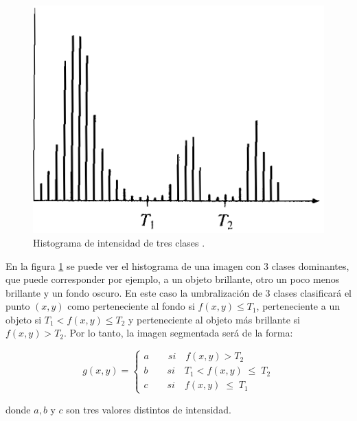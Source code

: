 \begin{figure}[ht!]
\begin{center}
\includegraphics[scale=0.35]{img/hist3clases.png}
\end{center}
\vspace{-0.5cm}
\caption{Histograma de intensidad de tres clases \cite{segment}.}
\label{hist3class}
\end{figure}

En la figura \ref{hist3class} se puede ver el histograma de una imagen con 3 clases dominantes, que puede corresponder por ejemplo, a un objeto brillante, otro un poco menos brillante y un fondo oscuro. En este caso la umbralización de 3 clases clasificará el punto $(x,y)$ como perteneciente al fondo si $f(x,y) {\leq} T_1$, perteneciente a un objeto si $T_1 < f(x,y) {\leq} T_2$ y perteneciente al objeto más brillante si $f(x,y) > T_2$. Por lo tanto, la imagen segmentada será de la forma:

\begin{equation}
g(x,y) = \left\{
\begin{array}{l}
\displaystyle a{\qquad}si{\quad}f(x,y) > {T_2}\\
\displaystyle b{\qquad}si{\quad}{T_1} < f(x,y)\;{\leq}\;{T_2}\\
\displaystyle c{\qquad}si{\quad}f(x,y)\;{\leq}\;{T_1}
\end{array} 
\right.
\label{eq:xdef3}
\end{equation}

donde $a,b$ y $c $ son tres valores distintos de intensidad.

